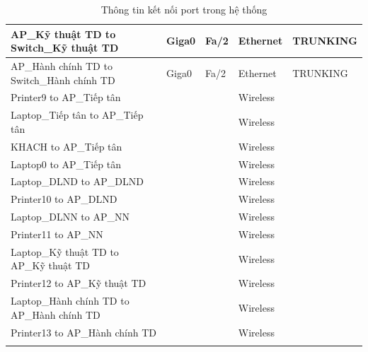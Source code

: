 \documentclass[a4paper, 12pt]{article}
\begin{document}
\begin{center}
\begin{longtable}{|p{}|p{}|p{}|p{}|p{}|}
\hline AP\_Kỹ thuật TD to Switch\_Kỹ thuật TD      &     Giga0     &     Fa/2    &  Ethernet  &  TRUNKING  \\
\hline AP\_Hành chính TD to Switch\_Hành chính TD      &     Giga0     &     Fa/2    &  Ethernet  &  TRUNKING  \\
\hline Printer9 to AP\_Tiếp tân      &         &        &  Wireless  &   \\
\hline Laptop\_Tiếp tân to AP\_Tiếp tân      &         &        &  Wireless  &   \\
\hline KHACH to AP\_Tiếp tân      &         &        &  Wireless  &   \\
\hline Laptop0 to AP\_Tiếp tân      &         &        &  Wireless  &   \\
\hline Laptop\_DLND to AP\_DLND      &         &        &  Wireless  &   \\
\hline Printer10 to AP\_DLND      &         &        &  Wireless  &   \\
\hline Laptop\_DLNN to AP\_NN      &         &        &  Wireless  &   \\
\hline Printer11 to AP\_NN      &         &        &  Wireless  &   \\
\hline Laptop\_Kỹ thuật TD to AP\_Kỹ thuật TD      &         &        &  Wireless  &   \\
\hline Printer12 to AP\_Kỹ thuật TD      &         &        &  Wireless  &   \\
\hline Laptop\_Hành chính TD to AP\_Hành chính TD      &         &        &  Wireless  &   \\
\hline Printer13 to AP\_Hành chính TD      &         &        &  Wireless  &   \\
\hline


    \caption{Thông tin kết nối port trong hệ thống}
    \label{hinh31}
\end{longtable}

\end{center}
\end{document}
